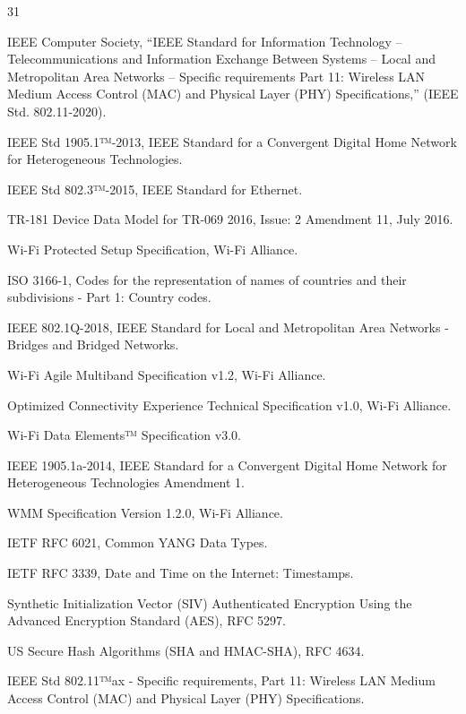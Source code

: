 
\begin{thebibliography}{31}
	
	IEEE Computer Society, ``IEEE Standard for Information Technology – Telecommunications and Information Exchange Between Systems – Local and Metropolitan Area Networks – Specific requirements Part 11: Wireless LAN Medium Access Control (MAC) and Physical Layer (PHY) Specifications,'' (IEEE Std. 802.11-2020).
	
	IEEE Std 1905.1™-2013, IEEE Standard for a Convergent Digital Home Network for Heterogeneous Technologies.
	
	IEEE Std 802.3™-2015, IEEE Standard for Ethernet.
	
	TR-181 Device Data Model for TR-069 2016, Issue: 2 Amendment 11, July 2016.
	
	Wi-Fi Protected Setup Specification, Wi-Fi Alliance.
	
	ISO 3166-1, Codes for the representation of names of countries and their subdivisions - Part 1: Country codes.
	
	IEEE 802.1Q-2018, IEEE Standard for Local and Metropolitan Area Networks - Bridges and Bridged Networks.
	
	Wi-Fi Agile Multiband Specification v1.2, Wi-Fi Alliance.
	
	Optimized Connectivity Experience Technical Specification v1.0, Wi-Fi Alliance.
	
	Wi-Fi Data Elements™ Specification v3.0.
	
	IEEE 1905.1a-2014, IEEE Standard for a Convergent Digital Home Network for Heterogeneous Technologies Amendment 1.
	
	WMM Specification Version 1.2.0, Wi-Fi Alliance.
	
	IETF RFC 6021, Common YANG Data Types.
	
	IETF RFC 3339, Date and Time on the Internet: Timestamps.
	
	Synthetic Initialization Vector (SIV) Authenticated Encryption Using the Advanced Encryption Standard (AES), RFC 5297.
	
	US Secure Hash Algorithms (SHA and HMAC-SHA), RFC 4634.
	
	IEEE Std 802.11™ax - Specific requirements, Part 11: Wireless LAN Medium Access Control (MAC) and Physical Layer (PHY) Specifications.
	

\end{thebibliography}
